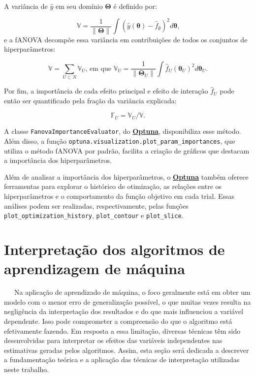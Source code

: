 \documentclass[
  12pt,
  a4paper,
]{scrreprt}
\begin{document}
\vspace{12pt}

A variância de \(\hat{y}\) em seu domínio \(\boldsymbol{\Theta}\) é
definido por:

\[
\mathbb{V} = \frac{1}{\|\boldsymbol{\Theta}\|} \int\left(\hat{y}\left(\boldsymbol{\theta}\right) - \hat{f}_{\emptyset}\right)^2 d \boldsymbol{\theta}\text{,}
\] e a fANOVA decompõe essa variância em contribuições de todos os
conjuntos de hiperparâmetros:

\[
\mathbb{V} = \sum_{U \subset N}\mathbb{V}_{U} \text{, em que } \mathbb{V}_U = \frac{1}{\|\boldsymbol{\Theta}_{U}\|} \int \hat{f}_U\left(\boldsymbol{\theta}_U\right)^2 d\boldsymbol{\theta}_U\text{.}
\]

\vspace{12pt}

Por fim, a importância de cada efeito principal e efeito de interação
\(\hat{f}_U\) pode então ser quantificado pela fração da variância
explicada:

\[
\mathbb{F}_{U} = \mathbb{V}_{U} / \mathbb{V}\text{.}
\]

\vspace{12pt}

A classe \texttt{FanovaImportanceEvaluator}, do
\href{https://optuna.org/}{\textbf{Optuna}}, disponibiliza esse método.
Além disso, a função
\texttt{optuna.visualization.plot\_param\_importances}, que utiliza o
método fANOVA por padrão, facilita a criação de gráficos que destacam a
importância dos hiperparâmetros.

\vspace{12pt}

Além de analisar a importância dos hiperparâmetros, o
\href{https://optuna.org/}{\textbf{Optuna}} também oferece ferramentas
para explorar o histórico de otimização, as relações entre os
hiperparâmetros e o comportamento da função objetivo em cada trial.
Essas análises podem ser realizadas, respectivamente, pelas funções
\texttt{plot\_optimization\_history}, \texttt{plot\_contour} e
\texttt{plot\_slice}.

\section{Interpretação dos algoritmos de aprendizagem de
máquina}\label{interpretauxe7uxe3o-dos-algoritmos-de-aprendizagem-de-muxe1quina}

~~~Na aplicação de aprendizado de máquina, o foco geralmente está em
obter um modelo com o menor erro de generalização possível, o que muitas
vezes resulta na negligência da interpretação dos resultados e do que
mais influenciou a variável dependente. Isso pode comprometer a
compreensão do que o algoritmo está efetivamente fazendo. Em resposta a
essa limitação, diversas técnicas têm sido desenvolvidas para
interpretar os efeitos das variáveis independentes nas estimativas
geradas pelos algoritmos. Assim, esta seção será dedicada a descrever a
fundamentação teórica e a aplicação das técnicas de interpretação
utilizadas neste trabalho.
\end{document}
